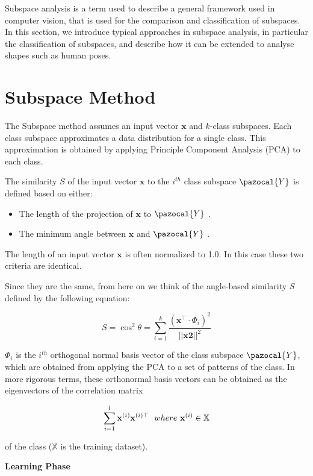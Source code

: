 Subspace analysis is a term used to describe a general framework used in computer vision, that is used for the comparison and classification of subspaces. In this section, we introduce typical approaches in subspace analysis, in particular the classification of subspaces, and describe how it can be extended to analyse shapes such as human poses.

\section{Subspace Method}

The Subspace method assumes an input vector $\mathbf{x}$ and $k$-class subspaces. Each class subspace approximates a data distribution for a single class. This approximation is obtained by applying Principle Component Analysis (PCA) to each class.

The similarity $S$ of the input vector $\mathbf{x}$ to the $i^{th}$ class subspace $\pazocal{Y}$ is defined based on either:

\begin{itemize}
    \item The length of the  projection of $\mathbf{x}$ to $\pazocal{Y}$ \cite{WATANABE1967EvaluationRecognition}.
    \item The minimum angle between $\mathbf{x}$ and $\pazocal{Y}$ \cite{Iijima1973THEORYMETHOD.}.
\end{itemize} 

The length of an input vector $\mathbf{x}$ is often normalized to 1.0. In this case these two criteria are identical. 

Since they are the same, from here on we think of the angle-based similarity $S$ defined by the following equation:

\[S = \cos^2{\theta} = \sum^{k}_{i=1} \frac{(\mathbf{x}^\top \cdot \Phi_i)^2}{||\mathbf{x2}||^2}\]

$\Phi_i$ is the $i^{th}$ orthogonal normal basis vector of the class subspace $\pazocal{Y}$, which are obtained from applying the PCA to a set of patterns of the class. In more rigorous terms, these orthonormal basis vectors can be obtained as the eigenvectors of the correlation matrix 

\[\sum^{l}_{i=1}\mathbf{x}^{(i)}\mathbf{x}^{(i)\top}  \ \ where \\ \ \mathbf{x}^{(i)} \in \mathbb{X} \]
    
of the class ($\mathbb{X}$ is the training dataset).

\textbf{Learning Phase}

